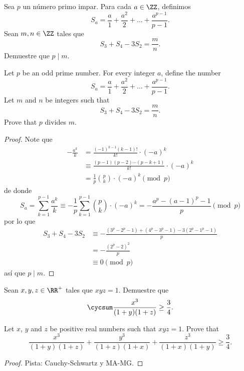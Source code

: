 \begin{probMG}[IMO 2011/N7]
  Sea $p$ un número primo impar. Para cada $a\in\ZZ$, definimos
  \[S_a=\frac{a}{1}+\frac{a^2}{2}+\dots+\frac{a^{p-1}}{p-1}.\]
  Sean $m,n\in\ZZ$ tales que
  \[S_3+S_4-3S_2=\frac mn.\]
  Demuestre que $p\mid m$.
  \begin{hint}
    Let $p$ be an odd prime number. For every integer $a$, define the number
    \[S_a=\frac{a}{1}+\frac{a^2}{2}+\dots+\frac{a^{p-1}}{p-1}.\]
    Let $m$ and $n$ be integers such that
    \[S_3+S_4-3S_2=\frac mn.\]
    Prove that $p$ divides $m$.
  \end{hint}
\end{probMG}

\begin{proof}
  Note que
  \begin{align*}
    -\frac{a^k}{k}
    &= \frac{(-1)^{k-1}(k-1)!}{k!}\cdot(-a)^k \\
    &\equiv \frac{(p-1)(p-2)\cdots(p-k+1)}{k!}\cdot(-a)^k \\
    &= \frac 1p\binom pk\cdot(-a)^k\pmod p
  \end{align*}
  de donde
  \[
    S_a
    =\sum_{k=1}^{p-1}\frac{a^k}{k}
    \equiv -\frac1p\sum_{k=1}^{p-1}\binom pk\cdot(-a)^k
    =-\frac{a^p-(a-1)^p-1}{p}\pmod p
  \]
  por lo que
  \begin{align*}
    S_3+S_4-3S_2
    &\equiv -\frac{(3^p-2^p-1)+(4^p-3^p-1)-3(2^p-1^p-1)}{p} \\
    &= -\frac{(2^p-2)^2}{p} \\
    &\equiv 0\pmod p
  \end{align*}
  así que $p\mid m$.
\end{proof}

\note[Álgebra]{}

\begin{probEG}[ISL 1998/A3]
  Sean $x,y,z\in\RR^+$ tales que $xyz=1$. Demuestre que
  \[\cycsum\frac{x^3}{(1+y)(1+z)}\ge\frac34.\]
  \begin{hint}
    Let $x$, $y$ and $z$ be positive real numbers such that $xyz=1$. Prove that
    \[
      \frac{x^3}{(1+y)(1+z)}+\frac{y^3}{(1+z)(1+x)}+\frac{z^3}{(1+x)(1+y)}
      \ge\frac34.
    \]
  \end{hint}
\end{probEG}

\begin{proof}
  Pista: Cauchy-Schwartz y MA-MG.
\end{proof}

